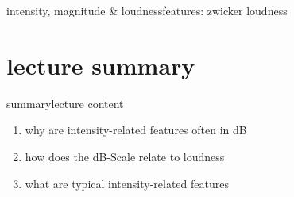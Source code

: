 \begin{frame}{intensity, magnitude \& loudness}{features: zwicker loudness}
{\begin{itemize}
            \end{itemize}
            }
        \end{frame}
                


    \section[summary]{lecture summary}
        \begin{frame}{summary}{lecture content}
            \begin{enumerate}
                \item   why are intensity-related features often in dB
                \smallskip
                \item<2->   how does the dB-Scale relate to loudness
                \smallskip
                \item<3->   what are typical intensity-related features
            \end{enumerate}
        \end{frame}


